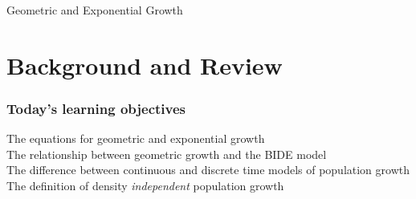 \documentclass[color=usenames,dvipsnames]{beamer}\usepackage[]{graphicx}\usepackage[]{xcolor}
\begin{document}


{
\begin{frame}[plain]
  \vspace{-4.2cm}
  \begin{center}
    {\huge Geometric and Exponential Growth } \\
  \end{center}
\end{frame}
}





\section{Background and Review}



\begin{frame}[plain]
  \frametitle{Today's learning objectives}
  \large
  The equations for geometric and exponential growth \\
  \pause
  \vfill
  The relationship between geometric growth and the BIDE model \\
  \pause
  \vfill
  The difference between continuous and discrete time models of
  population growth \\
  \pause
  \vfill
  The definition of density \textit{independent} population growth \\
\end{frame}
\end{document}
